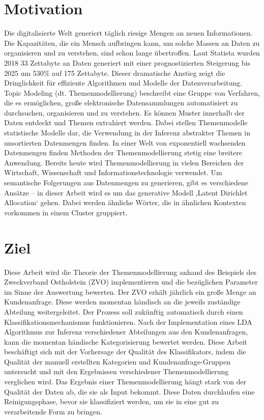 \documentclass[german,version-2020-11]{uzl-thesis}
\begin{document}
\section{Motivation}
Die digitalisierte Welt generiert täglich riesige Mengen an neuen Informationen. Die Kapazitäten, die ein Mensch aufbringen kann, um solche Massen an Daten zu organisieren und zu verstehen, sind schon lange übertroffen. Laut Statista wurden 2018 33 Zettabyte an Daten generiert mit einer prognostizierten Steigerung bis 2025 um 530\% auf 175 Zettabyte. Dieser dramatische Anstieg zeigt die Dringlichkeit für effiziente Algorithmen und Modelle der Datenverarbeitung. Topic Modeling (dt. Themenmodellierung) beschreibt eine Gruppe von Verfahren, die es ermöglichen, große elektronische Datensammlungen automatisiert zu durchsuchen, organisieren und zu verstehen. Es können Muster innerhalb der Daten entdeckt und Themen extrahiert werden. Dabei stellen Themenmodelle statistische Modelle dar, die Verwendung in der Inferenz abstrakter Themen in unsortierten Datenmengen finden. In einer Welt von exponentiell wachsenden Datenmengen finden Methoden der Themenmodellierung stetig eine breitere Anwendung. Bereits heute wird Themenmodellierung in vielen Bereichen der Wirtschaft, Wissenschaft und Informationstechnologie verwendet. Um semantische Folgerungen aus Datenmengen zu generieren, gibt es verschiedene Ansätze – in dieser Arbeit wird es um das generative Modell ‚Latent Dirichlet Allocation‘ gehen. Dabei werden ähnliche Wörter, die in ähnlichen Kontexten vorkommen in einem Cluster gruppiert. 

\section{Ziel}
Diese Arbeit wird die Theorie der Themenmodellierung anhand des Beispiels des Zweckverband Ostholstein (ZVO) implementieren und die bezüglichen Parameter im Sinne der Auswertung bewerten. Der ZVO erhält jährlich ein große Menge an Kundenanfrage. Diese werden momentan händisch an die jeweils zuständige Abteilung weitergeleitet. Der Prozess soll zukünftig automatisch durch einen Klassifikationsmechanismus funktionieren. Nach der Implementation eines LDA Algorithmus zur Inferenz verschiedener Abteilungen aus den Kundenanfragen, kann die momentan händische Kategorisierung bewertet werden. Diese Arbeit beschäftigt sich mit der Vorhersage der Qualität des Klassifikators, indem die Qualität der manuell erstellten Kategorien und Kundenanfrage-Gruppen untersucht und mit den Ergebnissen verschiedener Themenmodellierung verglichen wird. Das Ergebnis einer Themenmodellierung hängt stark von der Qualität der Daten ab, die sie als Input bekommt. Diese Daten durchlaufen eine Reinigungsphase, bevor sie klassifiziert werden, um sie in eine gut zu verarbeitende Form zu bringen. 
\end{document}
